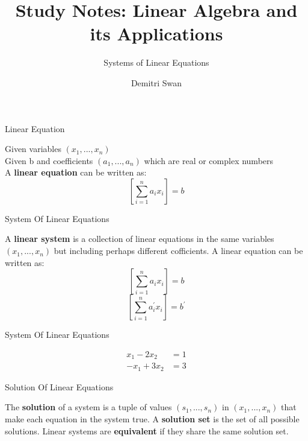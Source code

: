 \documentclass{beamer}
\title{Study Notes: Linear Algebra and its Applications}
\subtitle[short subtitle]{Systems of Linear Equations}
\author{Demitri Swan}
\date{}
\begin{document}
\begin{frame}
  \titlepage %
\end{frame}

\begin{frame}{Linear Equation}
\begin{definition}
Given variables $\left(x_{1}, ... , x_{n}\right)$\\
Given b and coefficients $\left(a_{1}, ... ,a_{n}\right)$ which are real or complex numbers\\
A \textbf{linear equation} can be written as:\\
\[ \left[ \sum_{i=1}^{n} a_{i}x_{i} \right] = b \]
\end{definition}
\end{frame}

\begin{frame}{System Of Linear Equations}
\begin{definition}
A \textbf{linear system} is a collection of linear equations in the same variables $\left(x_{1}, ... ,x_{n}\right)$ 
but including perhaps different cofficients. A linear equation can be written as:\\
\[ \left[ \sum_{i=1}^{n} a_{i}x_{i} \right] = b \]
\[ \left[ \sum_{i=1}^{n} a^{\prime}_{i}x_{i} \right] = b^{\prime} \]
\end{definition}
\end{frame}

\begin{frame}{System Of Linear Equations}
\begin{example}
\begin{align*}
x_{1} - 2x_{2} &= 1\\
-x_{1} + 3x_{2} &= 3
\end{align*}
\end{example}
\end{frame}

\begin{frame}{Solution Of Linear Equations}
\begin{definition}
The \textbf{solution} of a system is a tuple of values $\left(s_{1}, ... , s_{n}\right)$ in $\left(x_{1}, ... ,x_{n}\right)$ 
that make each equation in the system true. A \textbf{solution set} is the set of all possible solutions. 
Linear systems are \textbf{equivalent} if they share the same solution set.
\end{definition}
\end{frame}

\begin{frame}{}
\end{frame}
\end{document}
